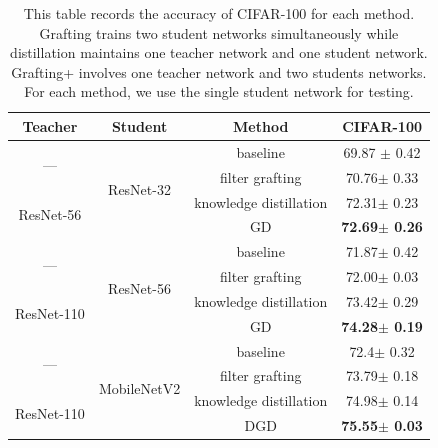 \documentclass{article}
\begin{document}
\begin{table}[!t]
	\caption{This table records the accuracy of CIFAR-100 for each method. Grafting trains two student networks simultaneously while distillation maintains one teacher network and one student network. Grafting+ involves one teacher network and two students networks. For each method, we use the single student network for testing. }
	\begin{center}
		\begin{tabular}{|c|c|c|c|} 
			\hline 
			Teacher&Student & Method&CIFAR-100 \\ 
			\hline
			\multirow{2}{*}{---}&	\multirow{4}{*}{ResNet-32}
			&baseline & 69.87 $\pm$ 0.42\\
			&&filter grafting&70.76$\pm$ 0.33\\
			\cline{1-1} 
			\multirow{2}{*}{ResNet-56}
			&&knowledge distillation&72.31$\pm$ 0.23\\
			&&GD&\textbf{72.69$\pm$ 0.26}\\
			\hline
			
			\hline
			\multirow{2}{*}{---}&	\multirow{4}{*}{ResNet-56}
			&baseline&71.87$\pm$ 0.42\\
			&&filter grafting&72.00$\pm$ 0.03\\
			\cline{1-1} 
			\multirow{2}{*}{ResNet-110}
			&&knowledge distillation&73.42$\pm$ 0.29\\
			&&GD&\textbf{74.28$\pm$ 0.19}\\
			\hline
			
			\hline
			\multirow{2}{*}{---}&	\multirow{4}{*}{MobileNetV2}
			&baseline&72.4$\pm$ 0.32\\
			&&filter grafting&73.79$\pm$ 0.18\\
			\cline{1-1} 
			\multirow{2}{*}{ResNet-110}
			&&knowledge distillation&74.98$\pm$ 0.14\\
			&&DGD&\textbf{75.55$\pm$ 0.03}\\
			\hline
		\end{tabular}\\
	\end{center}
	\label{table:grafting+_cifar}
\end{table}
\end{document}

